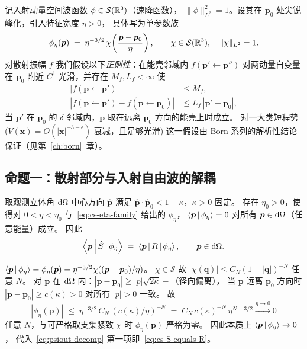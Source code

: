记入射动量空间波函数 $\phi \in \mathcal{S}(\mathbb{R}^3)$（速降函数），
$\|\phi\|_{L^2}^2 = 1$。设其在 $\bm{p}_0$ 处尖锐峰化，引入特征宽度 $\eta > 0$，
具体写为单参数族
\begin{equation}
\phi_\eta(\bm{p}) \;=\; \eta^{-3/2}\,\chi\!\left(\frac{\bm{p}-\bm{p}_0}{\eta}\right),
\qquad \chi \in \mathcal{S}(\mathbb{R}^3),\quad \|\chi\|_{L^2}=1.
\label{eq:cs-eta-family}
\end{equation}
对散射振幅 $f$ 我们假设以下\emph{正则性}：在能壳邻域内 $f(\bm{p}'\!\leftarrow\!\bm{p}'')$
对两动量自变量在 $\bm{p}_0$ 附近 $C^1$ 光滑，并存在 $M_f, L_f < \infty$ 使
\begin{align}
|f(\bm{p}\!\leftarrow\!\bm{p}')| &\leq M_f, \nonumber\\
|f(\bm{p}\!\leftarrow\!\bm{p}') - f(\bm{p}\!\leftarrow\!\bm{p}_0)| &\leq L_f\,|\bm{p}'-\bm{p}_0|,
\label{eq:cs-f-lipschitz}
\end{align}
当 $\bm{p}'$ 在 $\bm{p}_0$ 的 $\delta$ 邻域内，$\bm{p}$ 取在远离 $\bm{p}_0$ 方向的能壳上时成立。
对一大类短程势 ($V(\bm{x}) = O(|\bm{x}|^{-3-\epsilon})$ 衰减，且足够光滑) 这一假设由
Born 系列的解析性结论保证（见第~\ref{ch:born}~章）。

\subsection{命题一：散射部分与入射自由波的解耦}\label{ssec:cs-orth}

\begin{proposition}\label{prop:cs-Rphi-supp}
取观测立体角 $\mathrm{d}\Omega$ 中心方向 $\hat{\bm{p}}$ 满足
$\hat{\bm{p}}\cdot\hat{\bm{p}}_0 < 1 - \kappa$，$\kappa > 0$ 固定。
存在 $\eta_0 > 0$，使得对 $0 < \eta < \eta_0$ 与~\eqref{eq:cs-eta-family} 给出的 $\phi_\eta$，
$\left\langle \bm{p} \,\middle|\, \phi_\eta \right\rangle = 0$ 对所有 $\bm{p}\in\mathrm{d}\Omega$（任意能量）成立。
因此
\begin{equation}
\left\langle \bm{p} \,\middle|\, \hat{S} \,\middle|\, \phi_\eta \right\rangle \;=\; \left\langle \bm{p} \,\middle|\, R \,\middle|\, \phi_\eta \right\rangle,
\qquad \bm{p}\in\mathrm{d}\Omega.
\label{eq:cs-S-equals-R}
\end{equation}
\end{proposition}

\begin{proof*}
$\left\langle \bm{p} \,\middle|\, \phi_\eta \right\rangle = \phi_\eta(\bm{p}) = \eta^{-3/2}\chi((\bm{p}-\bm{p}_0)/\eta)$。
$\chi\in\mathcal{S}$ 故 $|\chi(\bm{q})|\leq C_N (1+|\bm{q}|)^{-N}$ 任意 $N$。
对 $\bm{p}$ 在 $\mathrm{d}\Omega$ 内：$|\bm{p}-\bm{p}_0|\geq |p|\sqrt{2\kappa} - $（径向偏离），
当 $\bm{p}$ 远离 $\bm{p}_0$ 方向时
$|\bm{p}-\bm{p}_0|\geq c(\kappa) > 0$ 对所有 $|p|>0$ 一致。
故
\begin{equation}
|\phi_\eta(\bm{p})| \;\leq\; \eta^{-3/2}\,C_N\,(c(\kappa)/\eta)^{-N} \;=\; C_N\,c(\kappa)^{-N}\,\eta^{N-3/2}
\xrightarrow{\eta\to 0} 0
\label{eq:cs-phi-decay}
\end{equation}
任意 $N$，与可严格取支集紧致 $\chi$ 时 $\phi_\eta(\bm{p})$ 严格为零。
因此本质上 $\left\langle \bm{p} \,\middle|\, \phi_\eta \right\rangle\to 0$，
代入~\eqref{eq:psiout-decomp} 第一项即~\eqref{eq:cs-S-equals-R}。
\end{proof*}

